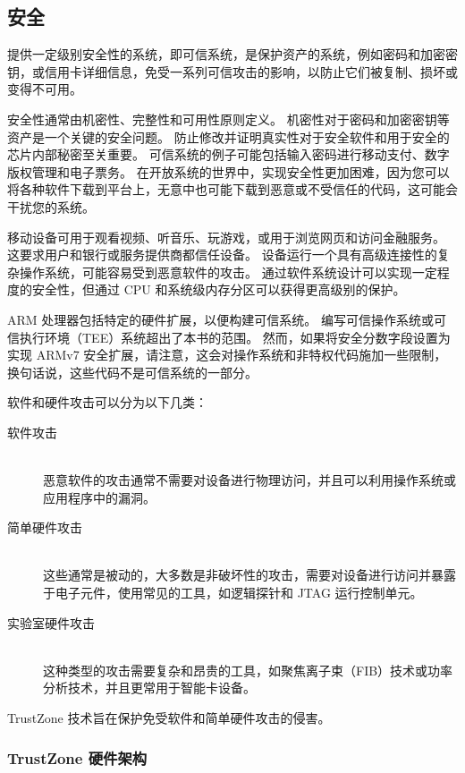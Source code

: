 \subsection{安全}

提供一定级别安全性的系统，即可信系统，是保护资产的系统，例如密码和加密密钥，或信用卡详细信息，免受一系列可信攻击的影响，以防止它们被复制、损坏或变得不可用。

安全性通常由机密性、完整性和可用性原则定义。
机密性对于密码和加密密钥等资产是一个关键的安全问题。
防止修改并证明真实性对于安全软件和用于安全的芯片内部秘密至关重要。
可信系统的例子可能包括输入密码进行移动支付、数字版权管理和电子票务。
在开放系统的世界中，实现安全性更加困难，因为您可以将各种软件下载到平台上，无意中也可能下载到恶意或不受信任的代码，这可能会干扰您的系统。

移动设备可用于观看视频、听音乐、玩游戏，或用于浏览网页和访问金融服务。
这要求用户和银行或服务提供商都信任设备。
设备运行一个具有高级连接性的复杂操作系统，可能容易受到恶意软件的攻击。
通过软件系统设计可以实现一定程度的安全性，但通过 CPU 和系统级内存分区可以获得更高级别的保护。

ARM 处理器包括特定的硬件扩展，以便构建可信系统。
编写可信操作系统或可信执行环境（TEE）系统超出了本书的范围。
然而，如果将安全分数字段设置为实现 ARMv7 安全扩展，请注意，这会对操作系统和非特权代码施加一些限制，换句话说，这些代码不是可信系统的一部分。

软件和硬件攻击可以分为以下几类：

\begin{description}
  \item[软件攻击] \hfill \\
    恶意软件的攻击通常不需要对设备进行物理访问，并且可以利用操作系统或应用程序中的漏洞。
  \item[简单硬件攻击] \hfill \\
    这些通常是被动的，大多数是非破坏性的攻击，需要对设备进行访问并暴露于电子元件，使用常见的工具，如逻辑探针和 JTAG 运行控制单元。
  \item[实验室硬件攻击] \hfill \\
    这种类型的攻击需要复杂和昂贵的工具，如聚焦离子束（FIB）技术或功率分析技术，并且更常用于智能卡设备。
\end{description}

TrustZone 技术旨在保护免受软件和简单硬件攻击的侵害。

\subsubsection{TrustZone 硬件架构}

